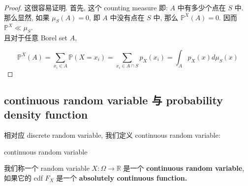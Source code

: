 \documentclass{qlnotes-export}
\begin{document}
\begin{proof}

这很容易证明. 首先, 这个 counting measure 即: \(A\) 中有多少个点在 \(S\) 中.\\
那么显然, 如果 \(\mu_{S}(A) = 0\), 即 \(A\) 中没有点在 \(S\) 中, 那么 \({\mathbb{P}}^{X}(A) = 0\). 因而 \({\mathbb{P}}^{X} \ll \mu_{S}\).\\
且对于任意 Borel set \(A\),

\[{\mathbb{P}}^{X}(A) = \sum\limits_{x_{i} \in A}{\mathbb{P}}(X = x_{i}) = \sum\limits_{x_{i} \in A \cap S}p_{X}(x_{i}) = \int_{A}p_{X}(x) d\mu_{S}(x)\]

\end{proof}

\subsection{continuous random variable 与 probability density function}\label{continuous-random-variable-ux4e0e-probability-density-function}

相对应 discrete random variable, 我们定义 continuous random variable:

\begin{definition}{continuous random variable}\label{def-02-random-variables-continuous-random-variable}

我们称一个 random variable \(X:\Omega\rightarrow{\mathbb{R}}\) 是一个 \textbf{continuous random variable}, 如果它的 cdf \(F_{X}\) 是一个 \textbf{absolutely continuous function.}

\end{definition}
\end{document}
